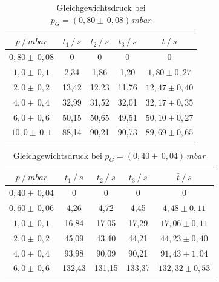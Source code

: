 \begin{table}[H]
\centering
\begin{tabular}{c|c|c|c|c}
	{$p \:/\: \si{mbar}$} & {$t_1 \:/\: \si{s} $} & {$t_2 \:/\: \si{s} $} & {$t_3 \:/\: \si{s} $} & {$\bar{t} \:/\: \si{s}$}\\
\midrule
$0,80 \pm \, 0,08$ &0 &0 &0 &0\\
$1,0 \pm \, 0,1$ &   2,34 &  1,86 &  1,20 & $1,80 \pm 0,27$\\
$2,0 \pm \, 0,2$ &   13,42  &  12,23 &  11,76 & $12,47 \pm 0,40 $\\
$4,0 \pm \, 0,4$ &   32,99 &  31,52 &  32,01 & $32,17 \pm 0,35 $\\
$6,0 \pm \, 0,6$  &   50,15 &  50,65 &  49,51 & $50,10 \pm 0,27 $\\
$10,0 \pm \, 0,1$ &   88,14 &  90,21 &  90,73 & $89,69 \pm 0,65 $\\
\end{tabular}
\caption{Gleichgewichtsdruck bei $p_G=(0,80 \pm \, 0,08) \, \si{mbar}$}
\label{tab:leck_Dreh2}
\end{table}

\begin{table}[H]
\centering
\begin{tabular}{c|c|c|c|c}
	{$p \:/\: \si{mbar}$} & {$t_1 \:/\: \si{s} $} & {$t_2 \:/\: \si{s} $} & {$t_3 \:/\: \si{s} $} & {$\bar{t} \:/\: \si{s}$}\\
\midrule
$0,40 \pm \, 0,04$ &0 &0 &0 &0\\
$0,60 \pm \, 0,06$ &   4,26 &  4,72 &  4,45 & $4,48 \pm 0,11$\\
$1,0 \pm \, 0,1$ &   16,84  &  17,05 &  17,29 & $17,06 \pm 0,11 $\\
$2,0 \pm \, 0,2$ &   45,09 &  43,40 &  44,21 & $44,23 \pm 0,40 $\\
$4,0 \pm \, 0,4$ &   93,98 &  90,09 & 90,21 & $91,43 \pm 1,04 $\\
$6,0 \pm \, 0,6$ &   132,43 &  131,15 &  133,37 & $132,32 \pm 0,53 $\\
\end{tabular}
\caption{Gleichgewichtsdruck bei $p_G=(0,40 \pm \, 0,04) \, \si{mbar}$}
\label{tab:leck_Dreh3}
\end{table}

